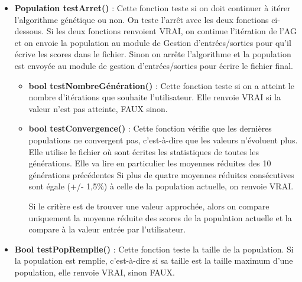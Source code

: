 \documentclass[a4paper,11pt]{article}
\begin{document}
				\begin{itemize}
							\item \textbf{Population testArret()} :  Cette fonction teste si on doit continuer à itérer l’algorithme génétique ou non. 
								On teste l’arrêt avec les deux fonctions ci-dessous. 
								Si les deux fonctions renvoient VRAI, on continue l’itération de l’AG et on envoie la population au module de Gestion d’entrées/sorties pour qu’il écrive les scores dans le fichier. 
								Sinon on arrête l'algorithme et la population est envoyée au module de gestion d’entrées/sorties pour écrire le fichier final.\vspace{0.2cm}
								\begin{itemize}
								\item \textbf{bool testNombreGénération()} : Cette fonction teste si on a atteint le nombre d’itérations que souhaite l’utilisateur.
									Elle renvoie VRAI si la valeur n’est pas atteinte, FAUX sinon.\vspace{0.2cm}

								\item \textbf{bool testConvergence()} : Cette fonction vérifie que les dernières populations ne convergent pas, c'est-à-dire que les valeurs n'évoluent plus. %
								Elle utilise le fichier où sont écrites les statistiques de toutes les générations. Elle va lire en particulier les moyennes réduites des 10 générations précédentes
															Si plus de quatre moyennes réduites consécutives sont égale (+/- 1,5$\%$) à celle de la population actuelle, on renvoie VRAI.

															Si le critère est de trouver une valeur approchée, alors on compare uniquement la moyenne réduite des scores de la population actuelle et la compare à la valeur entrée par l'utilisateur.\vspace{0.2cm}

								\end{itemize}
							
							\item \textbf{Bool testPopRemplie()} : Cette fonction teste la taille de la population. Si la population est remplie, c’est-à-dire si sa taille est la taille maximum d’une population, elle renvoie VRAI, sinon FAUX.\vspace{0.2cm}
					
					\end{itemize}
				
\end{document}

